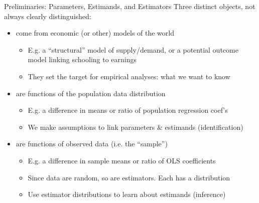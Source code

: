 \documentclass{beamer}
\begin{document}
\begin{frame}{Preliminaries: Parameters, Estimands, and Estimators}
\vspace{-0.3cm}
Three distinct objects, not always clearly distinguished: \pause
{\small
\begin{itemize}\itemsep0em
  \item {} come from economic (or other) models of the world
  \begin{itemize}\itemsep0em
    \item E.g. a ``structural'' model of supply/demand, or a potential outcome model linking schooling to earnings
    \item They set the target for empirical analyses: what we want to know
  \end{itemize}\pause
  
  \item {} are functions of the population data distribution 
  \begin{itemize}\itemsep0em
    \item E.g. a difference in means or ratio of population regression coef's
    \item We make assumptions to link parameters \& estimands (identification)
  \end{itemize}\pause
  
  \item {} are functions of observed data (i.e. the ``sample'')
  \begin{itemize}\itemsep0em
    \item E.g. a difference in sample means or ratio of OLS coefficients 
    \item Since data are random, so are estimators. Each has a distribution
    \item Use estimator distributions to learn about estimands (inference)
  \end{itemize}
\end{itemize}
}
\end{frame}
\end{document}
